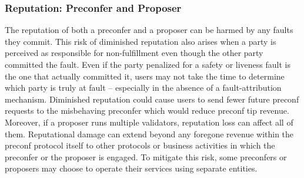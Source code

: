 \documentclass[a4paper]{article}
\theoremstyle{boldstyle}
\newcommand{\cm}[1]{\textcolor{blue}{\textbf{Conor:} #1}}
\begin{document}
    \subsubsection{Reputation: Preconfer and Proposer}
    \label{risk_reputation:preconfer}
    The reputation of both a preconfer and a proposer can be harmed by any faults they commit. This risk of diminished reputation also arises when a party is perceived as responsible for non-fulfillment even though the other party committed the fault. %
    Even if the party penalized for a safety or liveness fault is the one that actually committed it, users may not take the time to determine which party is truly at fault -- especially in the absence of a fault-attribution mechanism. Diminished reputation could cause users to send fewer future preconf requests to the misbehaving preconfer %
    which would reduce preconf tip revenue. Moreover, if a proposer runs multiple validators, reputation loss can affect all of them. 
    Reputational damage can extend beyond any foregone revenue within the preconf protocol itself to other protocols or business activities in which the preconfer or the proposer is engaged. To mitigate this risk, some preconfers or proposers may choose to operate their services using separate entities. 
    
\end{document}
